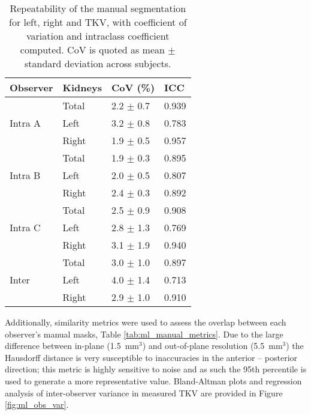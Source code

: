 \begin{table}[H]
	\centering
	\begin{tabular}{ll||l|l}
		Observer                 & Kidneys & CoV (\%)      & ICC   \\ \hline
		\multirow{3}{*}{Intra A} & Total   & 2.2 $\pm$ 0.7 & 0.939 \\ \cline{2-4} 
		& Left    & 3.2 $\pm$ 0.8 & 0.783 \\ \cline{2-4} 
		& Right   & 1.9 $\pm$ 0.5 & 0.957 \\ \hline
		\multirow{3}{*}{Intra B} & Total   & 1.9 $\pm$ 0.3 & 0.895 \\ \cline{2-4} 
		& Left    & 2.0 $\pm$ 0.5 & 0.807 \\ \cline{2-4} 
		& Right   & 2.4 $\pm$ 0.3 & 0.892 \\ \hline
		\multirow{3}{*}{Intra C} & Total   & 2.5 $\pm$ 0.9 & 0.908 \\ \cline{2-4} 
		& Left    & 2.8 $\pm$ 1.3 & 0.769 \\ \cline{2-4} 
		& Right   & 3.1 $\pm$ 1.9 & 0.940 \\ \hline
		\multirow{3}{*}{Inter}   & Total   & 3.0 $\pm$ 1.0 & 0.897 \\ \cline{2-4} 
		& Left    & 4.0 $\pm$ 1.4 & 0.713 \\ \cline{2-4} 
		& Right   & 2.9 $\pm$ 1.0 & 0.910
	\end{tabular}
	\caption{Repeatability of the manual segmentation for left, right and \ac{TKV}, with coefficient of variation and intraclass coefficient computed. \ac{CoV} is quoted as mean $\pm$ standard deviation across subjects.}
	\label{tab:ml_manual_repeatability}
\end{table}

Additionally, similarity metrics were used to assess the overlap between each observer’s manual masks, Table \ref{tab:ml_manual_metrics}. Due to the large difference between in-plane (1.5~mm$^3$) and out-of-plane resolution (5.5~mm$^3$) the Hausdorff distance is very susceptible to inaccuracies in the anterior – posterior direction; this metric is highly sensitive to noise and as such the 95th percentile is used to generate a more representative value. Bland-Altman plots and regression analysis of inter-observer variance in measured \ac{TKV} are provided in Figure \ref{fig:ml_obs_var}.

